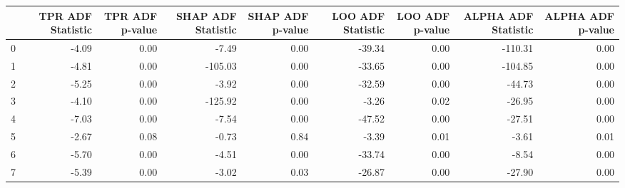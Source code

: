 \begin{tabular}{lrrrrrrrr}
\toprule
 & TPR ADF Statistic & TPR ADF p-value & SHAP ADF Statistic & SHAP ADF p-value & LOO ADF Statistic & LOO ADF p-value & ALPHA ADF Statistic & ALPHA ADF p-value \\
\midrule
0 & -4.09 & 0.00 & -7.49 & 0.00 & -39.34 & 0.00 & -110.31 & 0.00 \\
1 & -4.81 & 0.00 & -105.03 & 0.00 & -33.65 & 0.00 & -104.85 & 0.00 \\
2 & -5.25 & 0.00 & -3.92 & 0.00 & -32.59 & 0.00 & -44.73 & 0.00 \\
3 & -4.10 & 0.00 & -125.92 & 0.00 & -3.26 & 0.02 & -26.95 & 0.00 \\
4 & -7.03 & 0.00 & -7.54 & 0.00 & -47.52 & 0.00 & -27.51 & 0.00 \\
5 & -2.67 & 0.08 & -0.73 & 0.84 & -3.39 & 0.01 & -3.61 & 0.01 \\
6 & -5.70 & 0.00 & -4.51 & 0.00 & -33.74 & 0.00 & -8.54 & 0.00 \\
7 & -5.39 & 0.00 & -3.02 & 0.03 & -26.87 & 0.00 & -27.90 & 0.00 \\
\bottomrule
\end{tabular}
